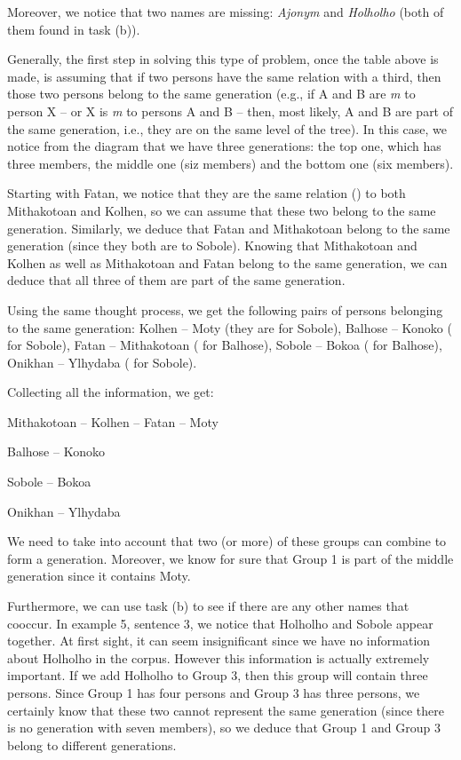 \begin{refsection}
\begin{mysolution}
Moreover, we notice that two names are missing: \emph{Ajonym} and \emph{Holholho} (both of them found in task (b)).

Generally, the first step in solving this type of problem, once the table above is made, is assuming that if two persons have the same relation with a third, then those two persons belong to the same generation (e.g., if A and B are \emph{m} to person X -- or X is \emph{m} to persons A and B -- then, most likely, A and B are part of the same generation, i.e., they are on the same level of the tree). In this case, we notice from the diagram that we have three generations: the top one, which has three members, the middle one (siz members) and the bottom one (six members).

Starting with Fatan, we notice that they are the same relation () to both Mithakotoan and Kolhen, so we can assume that these two belong to the same generation. Similarly, we deduce that Fatan and Mithakotoan belong to the same generation (since they both are  to Sobole). Knowing that Mithakotoan and Kolhen as well as Mithakotoan and Fatan belong to the same generation, we can deduce that all three of them are part of the same generation.

Using the same thought process, we get the following pairs of persons belonging to the same generation: Kolhen – Moty (they are  for Sobole), Balhose – Konoko ( for Sobole), Fatan – Mithakotoan ( for Balhose), Sobole – Bokoa ( for Balhose), Onikhan – Ylhydaba ( for Sobole).

Collecting all the information, we get: 

\begin{description}[font=\normalfont]
\item[Group 1:] Mithakotoan – Kolhen – Fatan – Moty
\item[Group 2:] Balhose – Konoko
\item[Group 3:] Sobole – Bokoa
\item[Group 4:] Onikhan – Ylhydaba
\end{description}

We need to take into account that two (or more) of these groups can combine to form a generation. Moreover, we know for sure that Group 1 is part of the middle generation since it contains Moty.

Furthermore, we can use task (b) to see if there are any other names that cooccur. In example 5, sentence 3, we notice that Holholho and Sobole appear together. At first sight, it can seem insignificant since we have no information about Holholho in the corpus. However this information is actually extremely important. If we add Holholho to Group 3, then this group will contain three persons. Since Group 1 has four persons and Group 3 has three persons, we certainly know that these two cannot represent the same generation (since there is no generation with seven members), so we deduce that Group 1 and Group 3 belong to different generations.


\end{mysolution}
\end{refsection}
